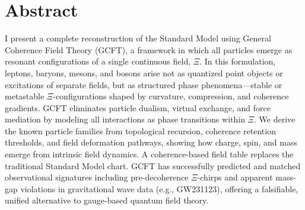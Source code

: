 
\section{Abstract}

I present a complete reconstruction of the Standard Model using General Coherence Field Theory (GCFT), a framework in which all particles emerge as resonant configurations of a single continuous field, $\Xi$. In this formulation, leptons, baryons, mesons, and bosons arise not as quantized point objects or excitations of separate fields, but as structured phase phenomena—stable or metastable $\Xi$-configurations shaped by curvature, compression, and coherence gradients. GCFT eliminates particle dualism, virtual exchange, and force mediation by modeling all interactions as phase transitions within $\Xi$. We derive the known particle families from topological recursion, coherence retention thresholds, and field deformation pathways, showing how charge, spin, and mass emerge from intrinsic field dynamics. A coherence-based field table replaces the traditional Standard Model chart. GCFT has successfully predicted and matched observational signatures including pre-decoherence $\Xi$-chirps and apparent mass-gap violations in gravitational wave data (e.g., GW231123), offering a falsifiable, unified alternative to gauge-based quantum field theory.
